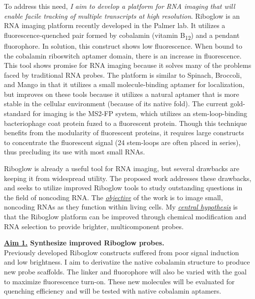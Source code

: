 To address this need, \textit{I aim to develop a platform for RNA imaging that will enable facile tracking of multiple transcripts at high resolution}. Riboglow is an RNA imaging platform recently developed in the Palmer lab. It utilizes a fluorescence-quenched pair formed by cobalamin (vitamin B\textsubscript{12}) and a pendant fluorophore. In solution, this construct shows low fluorescence. When bound to the cobalamin riboswitch aptamer domain\cite{JohnsonJrB12cofactorsdirectly2012}, there is an increase in fluorescence. This tool shows promise for RNA imaging because it solves many of the problems faced by traditional RNA probes. The platform is similar to Spinach\cite{PaigeRNAMimicsGreen2011}, Broccoli\cite{FilonovBroccoliRapidSelection2014}, and Mango\cite{AutourFluorogenicRNAMango2018,DolgosheinaRNAMangoAptamerFluorophore2014} in that it utilizes a small molecule-binding aptamer for localization, but improves on these tools because it utilizes a natural aptamer that is more stable in the cellular environment (because of its native fold). The current gold-standard for imaging is the MS2-FP system\cite{FuscoSinglemRNAMolecules2003}, which utilizes an stem-loop-binding bacteriophage coat protein fuzed to a fluorescent protein. Though this technique benefits from the modularity of fluorescent proteins, it requires large constructs to concentrate the fluorescent signal (24 stem-loops are often placed in series), thus precluding its use with most small RNAs.

Riboglow is already a useful tool for RNA imaging, but several drawbacks are keeping it from widespread utility. The proposed work addresses these drawbacks, and seeks to utilize improved Riboglow tools to study outstanding questions in the field of noncoding RNA. The \underline{\textit{objective}} of the work is to image small, noncoding RNAs as they function within living cells. My \underline{\textit{central hypothesis}} is that the Riboglow platform can be improved through chemical modification and RNA selection to provide brighter, multicomponent probes.

{\bf \underline{Aim 1.} Synthesize improved Riboglow probes.}\\
Previously developed Riboglow constructs suffered from poor signal induction and low brightness. I aim to derivatize the native cobalamin structure to produce new probe scaffolds. The linker and fluorophore will also be varied with the goal to maximize fluorescence turn-on. These new molecules will be evaluated for quenching efficiency and will be tested with native cobalamin aptamers.

